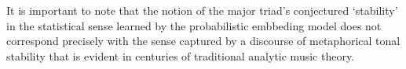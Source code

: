 
It is important to note that the notion of the major triad's conjectured `stability' in the statistical sense learned by the probabilistic embbeding model does not correspond precisely with the sense captured by a discourse of metaphorical tonal stability that is evident in centuries of traditional analytic music theory.